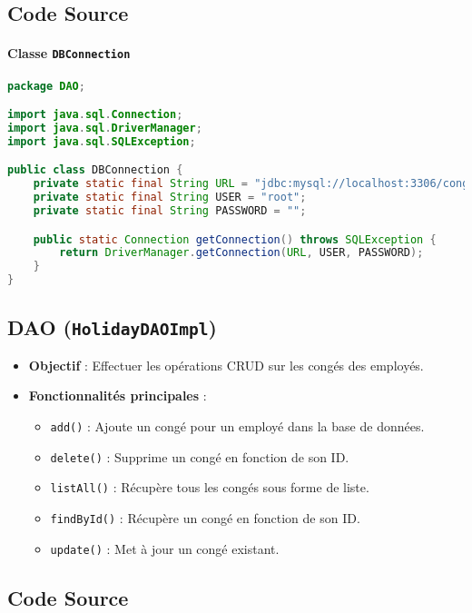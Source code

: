 \documentclass[a4paper,12pt]{article}
\begin{document}
\subsection{Code Source}
\paragraph{Classe \texttt{DBConnection}}
\begin{lstlisting}[language=Java, caption={Connexion à la base de données}, label={lst:dbconnection}]
package DAO;

import java.sql.Connection;
import java.sql.DriverManager;
import java.sql.SQLException;

public class DBConnection {
    private static final String URL = "jdbc:mysql://localhost:3306/conge";
    private static final String USER = "root";
    private static final String PASSWORD = "";

    public static Connection getConnection() throws SQLException {
        return DriverManager.getConnection(URL, USER, PASSWORD);
    }
}
\end{lstlisting}
\subsection{DAO (\texttt{HolidayDAOImpl})}
\begin{itemize}
    \item \textbf{Objectif} : Effectuer les opérations CRUD sur les congés des employés.
    \item \textbf{Fonctionnalités principales} :
    \begin{itemize}
        \item \texttt{add()} : Ajoute un congé pour un employé dans la base de données.
        \item \texttt{delete()} : Supprime un congé en fonction de son ID.
        \item \texttt{listAll()} : Récupère tous les congés sous forme de liste.
        \item \texttt{findById()} : Récupère un congé en fonction de son ID.
        \item \texttt{update()} : Met à jour un congé existant.
    \end{itemize}
\end{itemize}

\subsection{Code Source}
\end{document}
